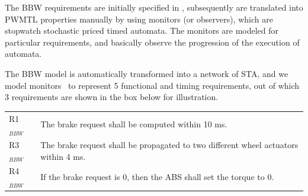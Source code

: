 The BBW requirements are initially specified in \resa, subsequently are translated into PWMTL properties manually by using monitors (or observers), which are stopwatch stochastic priced timed automata. The monitors are modeled for particular requirements, and basically observe the progression of the execution of automata.
\begin{example}\label{ex_resa}
	The BBW model is automatically transformed into a network of STA, and we model monitors~\cite{Filipovikj2018SimppaalModels} to represent 5 functional and timing requirements, out of which 3 requirements are shown in the box below for illustration. 
	\vspace{0.2cm}
\begin{elaboration}{0.9}
	\small
	{}
	\begin{tabular}{lp{}}
	R1$_{BBW}$ & The brake request shall be computed within 10 ms. \\
	R3$_{BBW}$ & The brake request shall be propagated to two different wheel actuators within 4 ms.\\
	R4$_{BBW}$ & If the brake request is 0, then the ABS shall set the torque to 0. \\
\end{tabular}
\end{elaboration}
\end{example}

